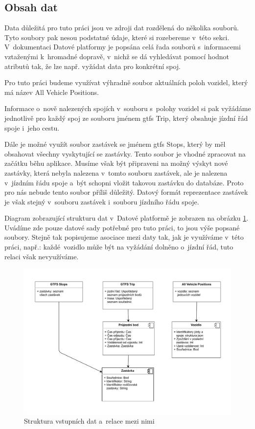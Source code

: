 \subsection{Obsah dat}

Data důležitá pro tuto práci jsou ve zdroji dat rozdělená do několika souborů. Tyto soubory pak nesou podstatné údaje, které si rozebereme v~této sekci. V~dokumentaci Datové platformy je popsána celá řada souborů s~informacemi vztaženými k~hromadné dopravě, v~nichž se dá vyhledávat pomocí hodnot atributů tak, že lze např. vyžádat data pro konkrétní spoj.

\bigbreak

Pro tuto práci budeme využívat výhradně soubor aktuálních poloh vozidel, který má název All Vehicle Positions.

\bigbreak

Informace o~nově nalezených spojích v~souboru s~polohy vozidel si pak vyžádáme jednotlivě pro každý spoj ze souboru jménem \gls{gtfs} Trip, který obsahuje jízdní řád spoje i~jeho cestu.

\bigbreak

Dále je možné využít soubor zastávek se jménem \gls{gtfs} Stops, který by měl obsahovat všechny vyskytující se zastávky. Tento soubor je vhodné zpracovat na začátku běhu aplikace. Musíme však být připraveni na možný výskyt nové zastávky, která nebyla nalezena v~tomto souboru zastávek, ale je nalezena v~jízdním řádu spoje a~být schopni vložit takovou zastávku do databáze. Proto pro nás nebude tento soubor příliš důležitý. Datový formát reprezentace zastávek je však stejný v~souboru zastávek i~souboru jízdního řádu spoje.

\bigbreak

Diagram zobrazující strukturu dat v~Datové platformě je zobrazen na obrázku \ref{fig:relace_vstupnich_dat}. Uvádíme zde pouze datové sady potřebné pro tuto práci, to jsou výše popsané soubory. Stejně tak popisujeme asociace mezi daty tak, jak je využíváme v~této práci, např.: každé vozidlo může být na vyžádání dolněno o~jízdní řád, tuto relaci však nevyužíváme.

\begin{figure}
	\centering
  \includegraphics[width=\linewidth]{../img/relace_vstupnich_dat}
  \caption{Struktura vstupních dat a~relace mezi nimi}
  \label{fig:relace_vstupnich_dat}
\end{figure}

